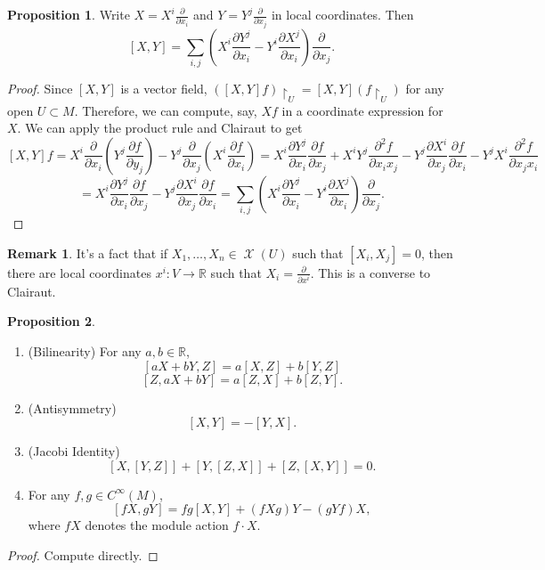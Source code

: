 \documentclass[10pt,letterpaper,cm]{nupset}
\theoremstyle{definition}
\newtheorem{remark}{Remark}
\newtheorem{prop}{Proposition}
\newcommand{\R}{\mathbb R}
\newcommand{\1}{\mathbf{1}}
\newcommand{\0}{\vec 0}
\DeclareMathOperator{\vf}{\mathscr{X}}
\begin{document}
\begin{prop}
Write $X = X^i\frac{\partial}{\partial{x_i}}$ and $Y = Y^j \frac{\partial}{\partial{x_j}}$ in local coordinates. Then $$[X, Y] = \sum_{i, j}(X^i \frac{\partial{Y^j}}{\partial{x_i}} - Y^i\frac{\partial{X^j}}{\partial{x_i}})\frac{\partial}{\partial{x_j}}.$$
\end{prop}
\begin{proof}
Since $[X, Y]$ is a vector field, $([X, Y]f) \restriction_U = [X, Y](f\restriction_U)$ for any open $U \subset M$. Therefore, we can compute, say, $Xf$ in a coordinate expression for $X$.  We can apply the product rule and Clairaut to get
$$[X, Y]f = X^i \frac{\partial}{\partial{x_i}} (Y^j \frac{\partial{f}}{\partial{y_j}}) - Y^j \frac{\partial}{\partial{x_j}} (X^i \frac{\partial{f}}{\partial{x_i}}) =  X^i \frac{\partial{Y^j}}{\partial{x_i}}\frac{\partial{f}}{\partial{x_j}} + X^i Y^j \frac{\partial^2{f}}{\partial{x_i}{x_j}} - Y^j \frac{\partial{X^i}}{\partial{x_j}}\frac{\partial{f}}{\partial{x_i}} - Y^j X^i \frac{\partial^2{f}}{\partial{x_j}{x_i}}$$ $$= X^i \frac{\partial{Y^j}}{\partial{x_i}}\frac{\partial{f}}{\partial{x_j}} -  Y^j \frac{\partial{X^i}}{\partial{x_j}}\frac{\partial{f}}{\partial{x_i}} = \sum_{i, j}(X^i \frac{\partial{Y^j}}{\partial{x_i}} - Y^i\frac{\partial{X^j}}{\partial{x_i}})\frac{\partial}{\partial{x_j}}.$$
\end{proof}

\begin{remark}
It's a fact that if $X_1, \ldots, X_n \in \vf(U)$ such that $[X_i, X_j]= 0$, then there are local coordinates $x^i : V \to \R$ such that $X_i  =\frac{\partial}{\partial{x^i}}$. This is a converse to Clairaut.
\end{remark}

\begin{prop} $ $
\begin{enumerate}
\item (Bilinearity) For any $a,b \in \R$, $$[aX + bY, Z] = a[X, Z] + b[Y, Z]$$ $$[Z, aX + bY] = a[Z, X] + b[Z, Y]. $$ 
\item (Antisymmetry) $$[X, Y] = -[Y,X].$$
\item (Jacobi Identity) $$[X, [Y, Z]]+ [Y, [Z, X]] + [Z, [X, Y]] =0  . $$
\item For any $f, g \in C^{\infty}(M)$, $$[fX, gY] = fg[X, Y] + (fXg)Y - (gYf)X, $$ where $fX$ denotes the module action $f \cdot X$.
\end{enumerate}
\end{prop}
\begin{proof} Compute directly. \end{proof}
\end{document}
